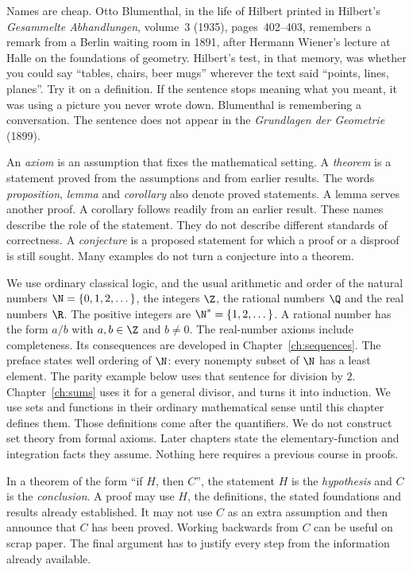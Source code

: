 Names are cheap. Otto Blumenthal, in the life of Hilbert printed in Hilbert's \emph{Gesammelte Abhandlungen}, volume~3 (1935), pages~402--403, remembers a remark from a Berlin waiting room in 1891, after Hermann Wiener's lecture at Halle on the foundations of geometry. Hilbert's test, in that memory, was whether you could say ``tables, chairs, beer mugs'' wherever the text said ``points, lines, planes''. Try it on a definition. If the sentence stops meaning what you meant, it was using a picture you never wrote down. Blumenthal is remembering a conversation. The sentence does not appear in the \emph{Grundlagen der Geometrie} (1899).

An \emph{axiom} is an assumption that fixes the mathematical setting. A \emph{theorem} is a statement proved from the assumptions and from earlier results. The words \emph{proposition}, \emph{lemma} and \emph{corollary} also denote proved statements. A lemma serves another proof. A corollary follows readily from an earlier result. These names describe the role of the statement. They do not describe different standards of correctness. A \emph{conjecture} is a proposed statement for which a proof or a disproof is still sought. Many examples do not turn a conjecture into a theorem.

\begin{reminder}
We use ordinary classical logic, and the usual arithmetic and order of the natural numbers $\N=\{0,1,2,\dots\}$, the integers $\Z$, the rational numbers $\Q$ and the real numbers $\R$. The positive integers are $\N^*=\{1,2,\dots\}$. A rational number has the form $a/b$ with $a,b\in\Z$ and $b\ne 0$. The real-number axioms include completeness. Its consequences are developed in Chapter~\ref{ch:sequences}. The preface states well ordering of $\N$: every nonempty subset of $\N$ has a least element. The parity example below uses that sentence for division by $2$. Chapter~\ref{ch:sums} uses it for a general divisor, and turns it into induction. We use sets and functions in their ordinary mathematical sense until this chapter defines them. Those definitions come after the quantifiers. We do not construct set theory from formal axioms. Later chapters state the elementary-function and integration facts they assume. Nothing here requires a previous course in proofs.
\end{reminder}

In a theorem of the form ``if $H$, then $C$'', the statement $H$ is the \emph{hypothesis} and $C$ is the \emph{conclusion}. A proof may use $H$, the definitions, the stated foundations and results already established. It may not use $C$ as an extra assumption and then announce that $C$ has been proved. Working backwards from $C$ can be useful on scrap paper. The final argument has to justify every step from the information already available.

